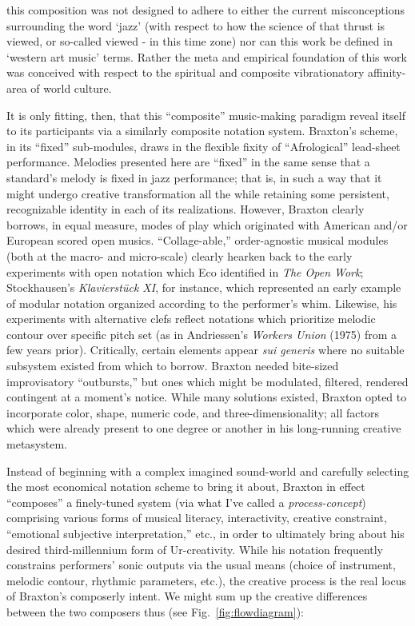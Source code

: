     \begin{smallquote}
        [...] this composition was not designed to adhere to either the current misconceptions surrounding the word `jazz' (with respect to how the science of that thrust is viewed, or so-called viewed - in this time zone) nor can this work be defined in `western art music' terms. Rather the meta and empirical foundation of this work was conceived with respect to the spiritual and composite vibrationatory affinity-area of world culture.\autocite[136--7]{Braxton_1988}
    \end{smallquote}

    It is only fitting, then, that this ``composite'' music-making paradigm reveal itself to its participants via a similarly composite notation system. Braxton's scheme, in its ``fixed'' sub-modules, draws in the flexible fixity of ``Afrological'' lead-sheet performance. Melodies presented here are ``fixed'' in the same sense that a standard's melody is fixed in jazz performance; that is, in such a way that it might undergo creative transformation all the while retaining some persistent, recognizable identity in each of its realizations. However, Braxton clearly borrows, in equal measure, modes of play which originated with American and/or European scored open musics. ``Collage-able,'' order-agnostic musical modules (both at the macro- and micro-scale) clearly hearken back to the early experiments with open notation which Eco identified in \textit{The Open Work}; Stockhausen's \textit{Klavierstück XI}, for instance, which represented an early example of modular notation organized according to the performer's whim.\autocite[1]{Eco_Robey_1989} Likewise, his experiments with alternative clefs reflect notations which prioritize melodic contour over specific pitch set (as in Andriessen's \textit{Workers Union} (1975) from a few years prior). Critically, certain elements appear \textit{sui generis} where no suitable subsystem existed from which to borrow. Braxton needed bite-sized improvisatory ``outbursts,'' but ones which might be modulated, filtered, rendered contingent at a moment's notice. While many solutions existed, Braxton opted to incorporate color, shape, numeric code, and three-dimensionality; all factors which were already present to one degree or another in his long-running creative metasystem.

    Instead of beginning with a complex imagined sound-world and carefully selecting the most economical notation scheme to bring it about, Braxton in effect ``composes'' a finely-tuned system (via what I've called a \textit{process-concept}) comprising various forms of musical literacy, interactivity, creative constraint, ``emotional subjective interpretation,'' etc., in order to ultimately bring about his desired third-millennium form of Ur-creativity. While his notation frequently constrains performers' sonic outputs via the usual means (choice of instrument, melodic contour, rhythmic parameters, etc.), the creative process is the real locus of Braxton's composerly intent. We might sum up the creative differences between the two composers thus (see Fig.~\ref{fig:flowdiagram}):

